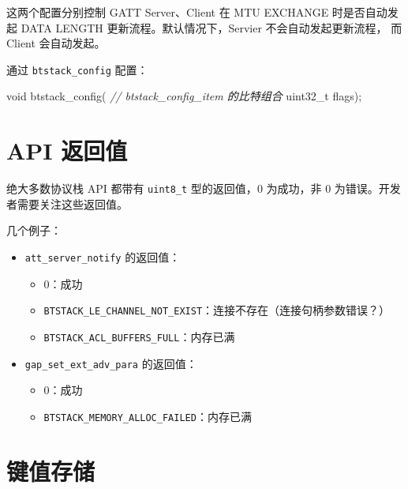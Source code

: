\documentclass[
  12pt,
]{book}
\newenvironment{Shaded}{\begin{snugshade}}{\end{snugshade}}
\newcommand{\CommentTok}[1]{\textcolor[rgb]{0.56,0.35,0.01}{\textit{#1}}}
\newcommand{\DataTypeTok}[1]{\textcolor[rgb]{0.13,0.29,0.53}{#1}}
\newcommand{\NormalTok}[1]{#1}
\providecommand{\tightlist}{%
  \setlength{\itemsep}{0pt}\setlength{\parskip}{0pt}}
\begin{document}
这两个配置分别控制 GATT Server、Client 在 MTU EXCHANGE 时是否自动发起 DATA LENGTH 更新流程。默认情况下，Servier 不会自动发起更新流程，
而 Client 会自动发起。

通过 \texttt{btstack\_config} 配置：

\begin{Shaded}
\begin{Highlighting}[]
\DataTypeTok{void}\NormalTok{ btstack_config(}
  \CommentTok{// btstack_config_item 的比特组合}
  \DataTypeTok{uint32_t}\NormalTok{ flags);}
\end{Highlighting}
\end{Shaded}

\hypertarget{api-ux8fd4ux56deux503c}{%
\section{API 返回值}\label{api-ux8fd4ux56deux503c}}

绝大多数协议栈 API 都带有 \texttt{uint8\_t} 型的返回值，\(0\) 为成功，非 \(0\) 为错误。开发者需要关注这些返回值。

几个例子：

\begin{itemize}
\item
  \texttt{att\_server\_notify} 的返回值：

  \begin{itemize}
  \tightlist
  \item
    \(0\)：成功
  \item
    \texttt{BTSTACK\_LE\_CHANNEL\_NOT\_EXIST}：连接不存在（连接句柄参数错误？）
  \item
    \texttt{BTSTACK\_ACL\_BUFFERS\_FULL}：内存已满
  \end{itemize}
\item
  \texttt{gap\_set\_ext\_adv\_para} 的返回值：

  \begin{itemize}
  \tightlist
  \item
    \(0\)：成功
  \item
    \texttt{BTSTACK\_MEMORY\_ALLOC\_FAILED}：内存已满
  \end{itemize}
\end{itemize}

\hypertarget{ux952eux503cux5b58ux50a8}{%
\section{键值存储}\label{ux952eux503cux5b58ux50a8}}
\end{document}
